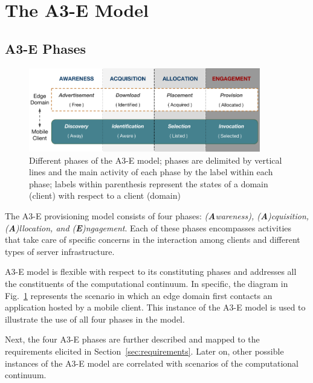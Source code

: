 \section{The A3-E Model}\label{sec:proposal}



\subsection{A3-E Phases}

\begin{figure}[tbp]
	\includegraphics[width=0.9\textwidth]{figs/A3-E.png}
	\caption{Different phases of the A3-E model; phases are delimited by vertical lines and the main activity of each phase by the label within each phase; labels within parenthesis represent the states of a domain (client) with respect to a client (domain)}
	\label{fig:A3-E-model}
\end{figure}

The A3-E provisioning model consists of four phases: \textit{(\textbf{A}wareness), (\textbf{A})cquisition, (\textbf{A})llocation, and (\textbf{E})ngagement}. Each of these phases encompasses activities that take care of specific concerns in the interaction among clients and different types of server infrastructure. 


A3-E model is flexible with respect to its constituting phases and addresses all the constituents of the computational continuum. In specific, the diagram in Fig.~\ref{fig:A3-E-model} represents the scenario in which an edge domain first contacts an application hosted by a mobile client. This instance of the A3-E model is used to illustrate the use of all four phases in the model. 

Next, the four A3-E phases are further described and mapped to the requirements elicited in  Section~\ref{sec:requirements}. Later on, other possible instances of the A3-E model are correlated with scenarios of the computational continuum.

